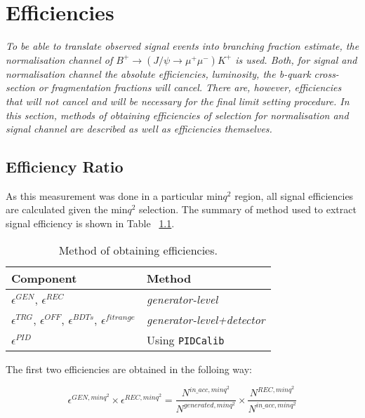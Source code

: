 \chapter{Efficiencies}

\textit{ To be able to translate observed signal events into branching fraction estimate,  the normalisation channel
of $B^{+} \rightarrow (J/\psi\rightarrow\mu^{+}\mu^{-})K^{+}$ is used. Both, for signal and normalisation
channel the absolute efficiencies, luminosity, the b-quark cross-section or fragmentation fractions will
cancel. There are, however, efficiencies that will not cancel and will be necessary for the final limit setting procedure. In this section, methods of obtaining efficiencies of selection for normalisation and signal channel are described as well as efficiencies themselves.}

\section{Efficiency Ratio}
\label{EfficiencyRatio}

As this measurement was done in a particular min$q^{2}$ region, all signal efficiencies are calculated given the min$q^{2}$ selection. The summary of method used to extract signal efficiency is shown in Table ~\ref{tab:signaleffsummary}.

\begin{table}[H]
\centering
\small
\hspace*{-0.5cm}\begin{tabular}{| l | l |}
\hline
Component & Method  \\ \hline
$\epsilon^{GEN}$, $\epsilon^{REC}$ & \textit{generator-level}   \\
$\epsilon^{TRG}$, $\epsilon^{OFF}$, $\epsilon^{BDTs}$, $\epsilon^{fitrange}$   & \textit{generator-level+detector} \\
$\epsilon^{PID}$ & Using \texttt{PIDCalib} \\
\hline
 \end{tabular}
 \caption{Method of obtaining efficiencies.}
\label{tab:signaleffsummary}
\end{table}

The first two efficiencies are obtained in the folloing way:

\begin{equation}
{\epsilon^{GEN,minq^{2}}}\times {\epsilon^{REC,minq^{2}}}= \frac{N^{in\_acc,minq^{2}}}{N^{generated,minq^{2}}}\times \frac{N^{REC,minq^{2}}}{N^{in\_acc,minq^{2}}}
\end{equation}

